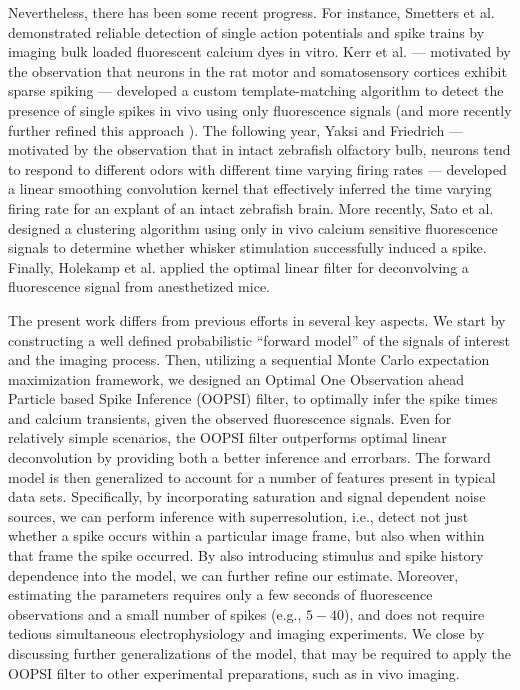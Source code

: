\documentclass[12pt]{article}
\begin{document}
Nevertheless, there has been some recent progress.  For instance, Smetters et al.  \cite{SmettersYuste99} demonstrated reliable detection of  single action potentials and spike trains by imaging bulk loaded fluorescent calcium dyes in vitro. Kerr et al. \cite{KerrHelmchen05} --- motivated by the observation that neurons in the rat motor and somatosensory cortices exhibit sparse spiking --- developed a custom template-matching algorithm to detect the presence of single spikes in vivo using only fluorescence signals (and more recently further refined this approach \cite{GreenbergKerr08}).  The following year, Yaksi and Friedrich  \cite{YaksiFriedrich06} --- motivated by the observation that in intact zebrafish olfactory bulb, neurons tend to respond to different odors with different time varying firing rates --- developed a linear smoothing convolution kernel that effectively inferred the time varying firing rate for an explant of an intact zebrafish brain.  More recently, Sato et al.  \cite{SatoSvoboda07} designed a clustering algorithm using only in vivo calcium sensitive fluorescence signals to determine whether whisker stimulation successfully induced a spike. Finally, Holekamp et al. \cite{HolekampHoly08} applied the optimal linear filter for deconvolving a fluorescence signal from anesthetized mice.

The present work differs from previous efforts in several key aspects.  We start by constructing a well defined probabilistic ``forward model'' of the signals of interest and the imaging process.  Then, utilizing a sequential Monte Carlo expectation maximization framework, we designed an Optimal One Observation ahead Particle based Spike Inference (OOPSI) filter, to optimally infer the spike times and calcium transients, given the observed fluorescence signals. Even for relatively simple scenarios, the OOPSI filter outperforms optimal linear deconvolution by providing both a better inference and errorbars.  The forward model is then generalized to account for a number of features present in typical data sets. Specifically, by incorporating saturation and signal dependent noise sources, we can perform inference with superresolution, i.e., detect not just whether a spike occurs within a particular image frame, but also when within that frame the spike occurred. By also introducing stimulus and spike history dependence into the model, we can further refine our estimate.  Moreover, estimating the parameters requires only a few seconds of fluorescence observations and a small number of spikes (e.g., $5-40$), and does not require tedious simultaneous electrophysiology and imaging experiments.  We close by discussing further generalizations of the model, that may be required to apply the OOPSI filter to other experimental preparations, such as in vivo imaging. 
\end{document}
